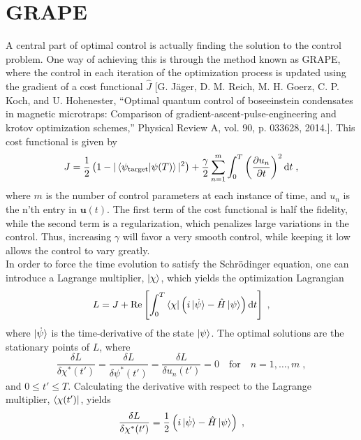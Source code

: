 \section{GRAPE}
A central part of optimal control is actually finding the solution to the control problem. One way of achieving this is through the method known as GRAPE, where the control in each iteration of the optimization process is updated using the gradient of a cost functional $\hat{J}$ [G. Jäger, D. M. Reich, M. H. Goerz, C. P. Koch, and U. Hohenester, “Optimal quantum control of boseeinstein
condensates in magnetic microtraps: Comparison of gradient-ascent-pulse-engineering and krotov
optimization schemes,” Physical Review A, vol. 90, p. 033628, 2014.]. This cost functional is given by
\begin{equation}
	J = \frac{1}{2} \left( 1-|\braket{\psi_{\mathrm{target}} | \psi (T)}|^2 \right) + \frac{\gamma}{2} \sum_{n=1}^{m} \int_{0}^{T} \left( \pdv{u_n}{t} \right)^2 \mathrm{d}t \; ,
\end{equation}
where $m$ is the number of control parameters at each instance of time, and $u_n$ is the n'th entry in $\boldsymbol{u}(t)$. The first term of the cost functional is half the fidelity, while the second term is a regularization, which penalizes large variations in the control. Thus, increasing $\gamma$ will favor a very smooth control, while keeping it low allows the control to vary greatly.\\
In order to force the time evolution to satisfy the Schrödinger equation, one can introduce a Lagrange multiplier, $\ket{\chi}$, which yields the optimization Lagrangian
\begin{equation}
	L = J + \Re \left[ \int_{0}^{T} \bra{\chi} \left( i \ket{\dot{\psi}} - \hat{H} \ket{\psi} \right) \mathrm{d}t \right] \; ,
\end{equation} 
where $\ket{\dot{\psi}}$ is the time-derivative of the state $\ket{\psi}$. The optimal solutions are the stationary points of $L$, where
\begin{equation}
	\frac{\delta L}{\delta \chi ^* (t')} = \frac{\delta L}{\delta \psi ^* (t')} = \frac{\delta L}{\delta u_n (t')} = 0 \quad \mathrm{for} \quad  n = 1, \ldots , m \; , \label{eq:statpoint}
\end{equation}
and $0 \leq t' \leq T$.
Calculating the derivative with respect to the Lagrange multiplier, $\bra{\chi (t')}$, yields
\begin{equation}
	\frac{\delta L}{\delta \chi ^* (t')} = \frac{1}{2} \left( i \ket{\dot{\psi}} -  \hat{H} \ket{\psi} \right) \; ,
\end{equation}
